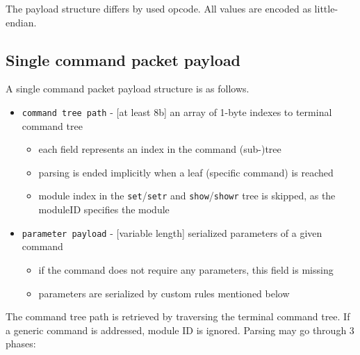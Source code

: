 The payload structure differs by used opcode. All values are encoded as little-endian.

\clearpage
\subsection{Single command packet payload}

A single command packet payload structure is as follows.


\begin{itemize}
	\item \texttt{command tree path} - [at least 8b] an array of 1-byte indexes to terminal command tree
		\begin{itemize}
			\item each field represents an index in the command (sub-)tree
			\item parsing is ended implicitly when a leaf (specific command) is reached
			\item module index in the \texttt{set}/\texttt{setr} and \texttt{show}/\texttt{showr} tree is skipped, as the moduleID specifies the module
		\end{itemize}
	\item \texttt{parameter payload} - [variable length] serialized parameters of a given command
		\begin{itemize}
			\item if the command does not require any parameters, this field is missing
			\item parameters are serialized by custom rules mentioned below
		\end{itemize}
\end{itemize}

The command tree path is retrieved by traversing the terminal command tree. If a generic command is addressed, module ID is ignored. Parsing may go through 3 phases:

